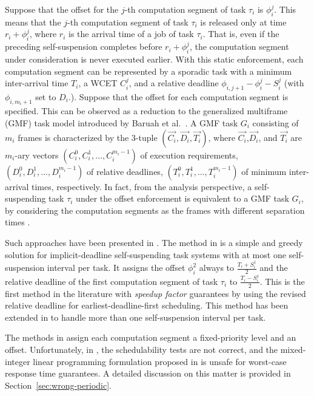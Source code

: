 Suppose that the offset for the $j$-th computation  segment of task $\tau_i$ is $\phi_i^j$. This means that the 
$j$-th computation segment of task $\tau_i$ is released only at time $r_i+\phi_i^j$, where $r_i$ is the arrival time of a job 
of task $\tau_i$. That is, even if the preceding self-suspension completes before $r_i+\phi_i^j$, the computation segment under 
consideration is never executed earlier. With this static enforcement, each computation segment can be represented by a sporadic 
task with a minimum inter-arrival time $T_i$, a WCET $C_i^j$, and a relative deadline $\phi_{i,j+1}-\phi_i^j-S_i^j$ (with 
$\phi_{i,m_i+1}$ set to $D_i$.).
Suppose that the offset for each computation segment is specified. This can be observed as a reduction to 
the generalized multiframe (GMF) task model introduced by Baruah et al.~\cite{baruah1999generalized}. A GMF task $G_i$ consisting of $m_i$ frames is characterized by the $3$-tuple $(\vec{C_i},\vec{D_i},\vec{T_i})$, where $\vec{C_i}$,$\vec{D_i}$, and $\vec{T_i}$ are $m_i$-ary vectors $(C_{i}^0,C_{i}^1,...,C_{i}^{m_i-1})$ of execution requirements, $(D_{i}^0,D_{i}^1,...,D_{i}^{m_i-1})$ of relative deadlines, $(T_{i}^0,T_{i}^1,...,T_{i}^{m_i-1})$ of minimum inter-arrival times, respectively.
In fact, from the analysis perspective, a self-suspending task $\tau_i$ under the offset enforcement is equivalent to a GMF task $G_i$,  by considering the computation segments as the frames with different separation times \cite{WC16-suspend-DATE,DBLP:journals/ieicet/DingTT09}.

Such approaches have been presented in 
\cite{RTSS-KimANR13,RTSS-ChenL14,WC16-suspend-DATE,DBLP:journals/ieicet/DingTT09}. The method in \cite{RTSS-ChenL14} is a simple and greedy solution for 
implicit-deadline self-suspending task systems with at most one self-suspension interval per task. It assigns the 
offset $\phi_i^2$ always to $\frac{T_i+S_i^1}{2}$ and the relative deadline of the first computation segment of task $\tau_i$ to 
$\frac{T_i-S_i^1}{2}$. This is the first method in the literature with \emph{speedup factor} guarantees by using the revised relative 
deadline for earliest-deadline-first scheduling. This method has been extended in \cite{WC16-suspend-DATE} to handle more than one self-suspension interval per task.



The methods in \cite{RTSS-KimANR13,DBLP:journals/ieicet/DingTT09} assign each computation segment a fixed-priority level and an offset. 
Unfortunately,  in \cite{RTSS-KimANR13,DBLP:journals/ieicet/DingTT09}, the schedulability tests are not correct, and the mixed-integer 
linear programming formulation proposed in \cite{RTSS-KimANR13} is unsafe for worst-case response time guarantees. 
A detailed discussion on this matter is 
provided in Section~\ref{sec:wrong-periodic}.

